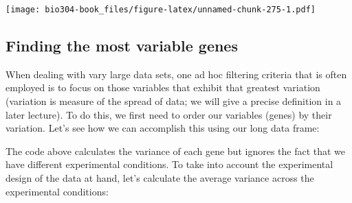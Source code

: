 \documentclass[]{book}
\newenvironment{Shaded}{\begin{snugshade}}{\end{snugshade}}
\newcommand{\CommentTok}[1]{\textcolor[rgb]{0.56,0.35,0.01}{\textit{#1}}}
\newcommand{\DataTypeTok}[1]{\textcolor[rgb]{0.13,0.29,0.53}{#1}}
\newcommand{\KeywordTok}[1]{\textcolor[rgb]{0.13,0.29,0.53}{\textbf{#1}}}
\newcommand{\NormalTok}[1]{#1}
\newcommand{\OperatorTok}[1]{\textcolor[rgb]{0.81,0.36,0.00}{\textbf{#1}}}
\newcommand{\OtherTok}[1]{\textcolor[rgb]{0.56,0.35,0.01}{#1}}
\newcommand{\StringTok}[1]{\textcolor[rgb]{0.31,0.60,0.02}{#1}}
\theoremstyle{definition}
\theoremstyle{definition}
\theoremstyle{definition}
\theoremstyle{remark}
\begin{document}
\texttt{[image: bio304-book\_files/figure-latex/unnamed-chunk-275-1.pdf]}

\hypertarget{finding-the-most-variable-genes}{%
\subsection{Finding the most variable
genes}\label{finding-the-most-variable-genes}}

When dealing with vary large data sets, one ad hoc filtering criteria
that is often employed is to focus on those variables that exhibit that
greatest variation (variation is measure of the spread of data; we will
give a precise definition in a later lecture). To do this, we first need
to order our variables (genes) by their variation. Let's see how we can
accomplish this using our long data frame:

\begin{Shaded}
\end{Shaded}

The code above calculates the variance of each gene but ignores the fact
that we have different experimental conditions. To take into account the
experimental design of the data at hand, let's calculate the average
variance across the experimental conditions:
\end{document}
